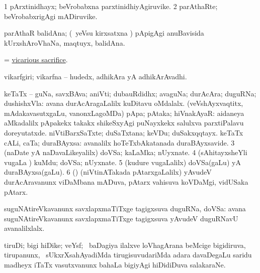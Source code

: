 \bentry
{} 
\gl{\nA}
\expl{}
\bmng
\bnum
\num{1} pArxtinidhayx; beVrobabxna parxtinidhiyAgiruvike. 
\num{2} parAthaRte; beVrobabxrigAgi mADiruvike. 
\enum
\emng
\eentry

\bentry
{}
\gl{\nA}
\expl{}
\bmng
 parAthaR balidAna; (\kanmu\ yeVsu kirxsatxna \vi) pApigAgi anuBavisida kUrxshAroVhaNa, maqtuyx, balidAna. 
\emng
\eentry

\bentry
{}
\gl{\nA}
\expl{}
\bmng
 = \hyperlink{vicarious sacrifice}{vicarious sacrifice}. 
\emng
\eentry

\bentry
{} 
\gl{\nA}
\expl{}
\bmng
 vikarfgiri; vikarfna -- hudedx, adhikAra yA adhikArAvadhi. 
\emng
\eentry

\bentry
{} 
\gl{\nA}
\expl{}
\bmng
\bnum
{} 
\banum
{} keTaTx -- guNa, savxBAva; aniVti; dubauRdidhx; avaguNa; durAcAra; duguRNa; dushishxVla:  avana durAcAragaLalilx kuDitavu oMdalalx. 
 (veVshAyxvaqtitx, mAdakavasutxgaLu, \mo vanonxLagoMDa) pApa; pAtaka; hiVnakAyaR:  aidaneya aMkadalilx pApakekx takakx shikeSxyAgi puNayxkekx salulxva parxtiPalavu doreyutatxde. 
\eanum
\numie
{} 
\banum
{} niVtiBarxSaTxte; duSaTxtana; keVDu; duSakxqqtayx. 
 keTaTx cALi, caTa; duraBAyxsa:  avanalilx hoTeTxbAkatanada duraBAyxsavide. 
\eanum
\numie
\num{3} (naDate yA naDavaLikeyalilx) doVSa; kaLaMka; nUyxnate. 
\num{4} (sAhitayxsheYli \mo vugaLa \vi) kuMdu; doVSa; nUyxnate. 
\num{5} (kudure \mo vugaLalilx) doVSa(gaLu) yA duraBAyxsa(gaLu). 
\num{6} (\ca) (niVtinATakada pAtarxgaLalilx) yAvudeV durAcAravanunx viDaMbana mADuva, pAtarx vahisuva koVDaMgi, vidUSaka pAtarx. 
\enum
\emng

\noindent 
\gl{\pagu}
\expl{}
\bmng
  suguNAtireVkavanunx savxlapxmaTiTxge tagigxsuva duguRNa, doVSa:  avana suguNAtireVkavanunx savxlapxmaTiTxge tagigxsuva yAvudeV duguRNavU avanalilxlalx. 
\emng
\eentry

\bentry 
{} 
\gl{\nA}
\expl{}
\bmng
 tiruDi; bigi hiDike; veYsf; \kanmu\ baDagiya ilalxve loVhagArana beMcige bigidiruva, tirupanunx, \kanmu\ sUkxrXsahAyadiMda tirugisuvudariMda adara davaDegaLu saridu madheyx iTaTx vasutxvanunx bahaLa bigiyAgi hiDidiDuva salakaraNe. 
\emng
\eentry

